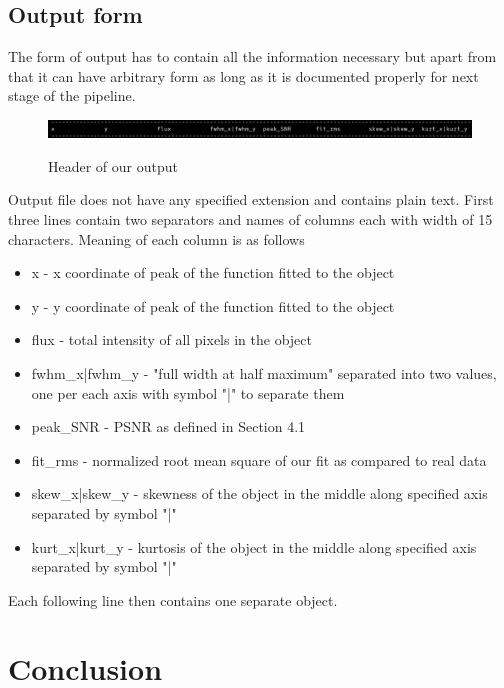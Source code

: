 \documentclass[12pt, a4paper, oneside]{book}
\begin{document}
\section{Output form}

The form of output has to contain all the information necessary but apart from that it can have arbitrary form as long as it is documented properly for next stage of the pipeline.

\begin{figure}[H]
    \begin{center}
        \includegraphics[scale=1.50]{images/output_form.png}
        \label{img:output_form}
        \caption{Header of our output}
    \end{center}
\end{figure}

Output file does not have any specified extension and contains plain text.
First three lines contain two separators and names of columns each with width of 15 characters.
Meaning of each column is as follows

\begin{itemize}
    \item x - x coordinate of peak of the function fitted to the object
    \item y - y coordinate of peak of the function fitted to the object
    \item flux - total intensity of all pixels in the object
    \item fwhm\_x|fwhm\_y - "full width at half maximum" separated into two values, one per each axis with symbol "|" to separate them
    \item peak\_SNR - PSNR as defined in Section 4.1
    \item fit\_rms - normalized root mean square of our fit as compared to real data
    \item skew\_x|skew\_y - skewness of the object in the middle along specified axis separated by symbol "|"
    \item kurt\_x|kurt\_y - kurtosis of the object in the middle along specified axis separated by symbol "|"
\end{itemize}

Each following line then contains one separate object.


\chapter{Conclusion}
\end{document}
